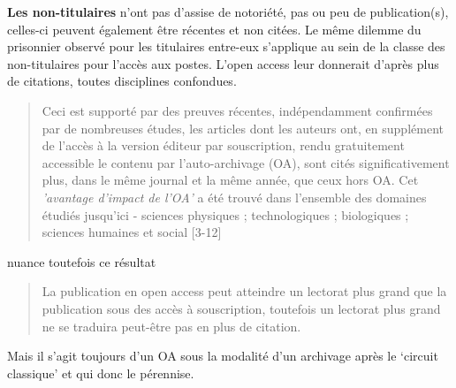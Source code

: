 \textbf{Les non-titulaires} n'ont pas d'assise de notoriété, pas ou peu de publication(s), celles-ci peuvent également être récentes et non citées.
Le même dilemme du prisonnier observé pour les titulaires entre-eux s'applique au sein de la classe des non-titulaires pour l'accès aux postes.
L'open access leur donnerait d'après \citeauthor{gargouri_self-selected_2010} plus de citations, toutes disciplines confondues.
\blockcquote[traduction]{gargouri_self-selected_2010}{
Ceci est supporté par des preuves récentes, indépendamment confirmées par de nombreuses études, les articles dont les auteurs ont, en supplément de l'accès à la version éditeur par souscription, rendu gratuitement accessible le contenu par l'auto-archivage (OA), sont cités significativement plus, dans le même journal et la même année, que ceux hors OA.
Cet \emph{'avantage d'impact de l'OA'} a été trouvé dans l'ensemble des domaines étudiés jusqu'ici - sciences physiques ; technologiques ; biologiques ; sciences humaines et social [3-12]
}
\citeauthor{davis_open_2011} nuance toutefois ce résultat
\blockcquote[traduction]{davis_open_2011}{
La publication en open access peut atteindre un lectorat plus grand que la publication sous des accès à souscription, toutefois un lectorat plus grand ne se traduira peut-être pas en plus de citation.
}
Mais il s'agit toujours d'un \gls{OA} sous la modalité d'un archivage après le `circuit classique' et qui donc le pérennise.
%
